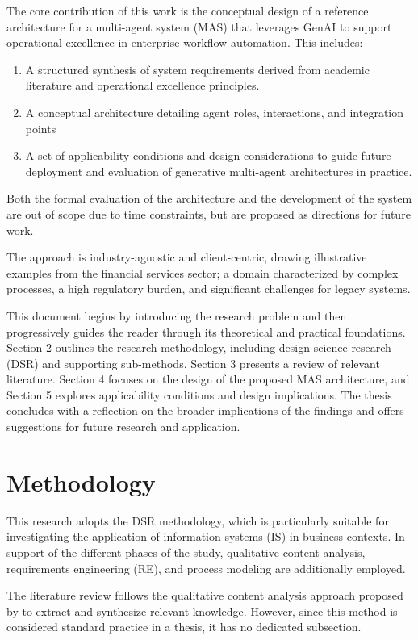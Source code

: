The core contribution of this work is the conceptual design of a reference architecture for a multi-agent system (MAS) that leverages GenAI to support operational excellence in enterprise workflow automation. This includes:
\begin{enumerate}
    \item A structured synthesis of system requirements derived from academic literature and operational excellence principles.
    \item A conceptual architecture detailing agent roles, interactions, and integration points
    \item A set of applicability conditions and design considerations to guide future deployment and evaluation of generative multi-agent architectures in practice.
\end{enumerate}

Both the formal evaluation of the architecture and the development of the system are out of scope due to time constraints, but are proposed as directions for future work.


The approach is industry-agnostic and client-centric, drawing illustrative examples from the financial services sector; a domain characterized by complex processes, a high regulatory burden, and significant challenges for legacy systems.

This document begins by introducing the research problem and then progressively guides the reader through its theoretical and practical foundations. Section 2 outlines the research methodology, including design science research (DSR) and supporting sub-methods. Section 3 presents a review of relevant literature. Section 4 focuses on the design of the proposed MAS architecture, and Section 5 explores applicability conditions and design implications. The thesis concludes with a reflection on the broader implications of the findings and offers suggestions for future research and application.

\section{Methodology} \label{2methodology}
This research adopts the DSR methodology, which is particularly suitable for investigating the application of information systems (IS) in business contexts. In support of the different phases of the study, qualitative content analysis, requirements engineering (RE), and process modeling are additionally employed.

The literature review follows the qualitative content analysis approach proposed by \textcite{mayringQualitativeContentAnalysis2022} to extract and synthesize relevant knowledge. However, since this method is considered standard practice in a thesis, it has no dedicated subsection.

